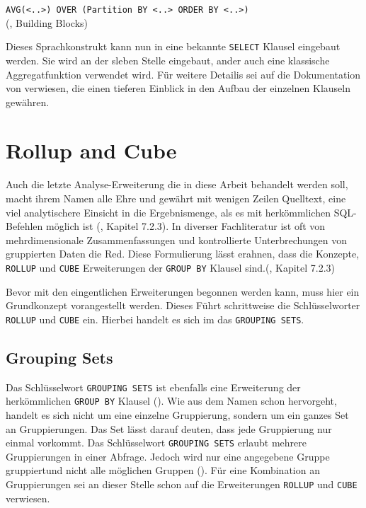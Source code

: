 \texttt{AVG(<..>) OVER (Partition BY <..> ORDER BY <..>)} \\ (\cite{Nuijten2023},
Building Blocks)

Dieses Sprachkonstrukt kann nun in eine bekannte \texttt{SELECT} Klausel
eingebaut werden. Sie wird an der sleben Stelle eingebaut, ander auch eine
klassische Aggregatfunktion verwendet wird. Für weitere Detailis sei auf die Dokumentation
von \citet{oracle} verwiesen, die einen tieferen Einblick in den Aufbau der einzelnen
Klauseln gewähren.


\section{Rollup and Cube}
Auch die letzte Analyse-Erweiterung die in diese Arbeit behandelt werden soll, macht
ihrem Namen alle Ehre und gewährt mit wenigen Zeilen Quelltext, eine viel
analytischere Einsicht in die Ergebnismenge, als es mit herkömmlichen SQL-Befehlen
möglich ist (\cite{melton2002advanced}, Kapitel 7.2.3). In diverser
Fachliteratur ist oft von mehrdimensionale Zusammenfassungen und kontrollierte
Unterbrechungen von gruppierten Daten die Red. Diese Formulierung lässt erahnen,
dass die Konzepte, \texttt{ROLLUP} und \texttt{CUBE} Erweiterungen der \texttt{GROUP
BY} Klausel sind.(\cite{melton2002advanced}, Kapitel 7.2.3)

Bevor mit den eingentlichen Erweiterungen begonnen werden kann, muss hier ein
Grundkonzept vorangestellt werden. Dieses Führt schrittweise die Schlüsselworter
\texttt{ROLLUP} und \texttt{CUBE} ein. Hierbei handelt es sich im das \texttt{GROUPING
SETS}.

\subsection{Grouping Sets}
Das Schlüsselwort \texttt{GROUPING SETS} ist ebenfalls eine Erweiterung der
herkömmlichen \texttt{GROUP BY} Klausel (\cite{oracle16}). Wie aus dem Namen
schon hervorgeht, handelt es sich nicht um eine einzelne Gruppierung, sondern um
ein ganzes Set an Gruppierungen. Das Set lässt darauf deuten, dass jede
Gruppierung nur einmal vorkommt. Das Schlüsselwort \texttt{GROUPING SETS}
erlaubt mehrere Gruppierungen in einer Abfrage. Jedoch wird nur eine angegebene Gruppe
gruppiertund nicht alle möglichen Gruppen (\cite{oracle16}). Für eine
Kombination an Gruppierungen sei an dieser Stelle schon auf die Erweiterungen
\texttt{ROLLUP} und \texttt{CUBE} verwiesen.

